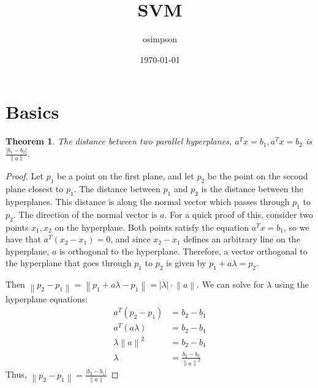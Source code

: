 \documentclass[12pt]{article}
\title{SVM}
\author{osimpson}
\date{\today}
\newtheorem{theorem}{Theorem}
\newcommand{\norm}[1]{\left\lVert#1\right\rVert}
\begin{document}
\maketitle

\section{Basics}

\begin{theorem}
    The distance between two parallel hyperplanes, $a^Tx=b_1, a^Tx=b_2$ is 
    $\frac{|b_1-b_2|}{\norm{a}}$.
\end{theorem}

\begin{proof}
    Let $p_1$ be a point on the first plane, and let $p_2$ be the point on the
    second plane closest to $p_1$.  The distance between $p_1$ and $p_2$ is the
    distance between the hyperplanes.  This distance is along the normal vector
    which passes through $p_1$ to $p_2$.  The direction of the normal vector is
    $a$.  For a quick proof of this, consider two points $x_1, x_2$ on the 
    hyperplane.  Both points satisfy the equation $a^Tx=b_1$, so we have that 
    $a^T(x_2-x_1)=0$, and since $x_2-x_1$ defines an arbitrary line on the
    hyperplane, $a$ is orthogonal to the hyperplane.  Therefore, a vector orthogonal
    to the hyperplane that goes through $p_1$ to $p_2$ is given by $p_1+a\lambda=p_2$.

    Then $\norm{p_2-p_1} = \norm{p_1+a\lambda - p_1} = |\lambda| \cdot \norm{a}$.
    We can solve for $\lambda$ using the hyperplane equations:
    \begin{equation}
        \begin{split}
            a^T(p_2-p_1) &= b_2-b_1 \\
            a^T(a\lambda) &= b_2-b_1 \\
            \lambda\norm{a}^2 &= b_2-b_1 \\
            \lambda &= \frac{b_2 - b_1}{\norm{a}^2}
        \end{split}
    \end{equation}
    Thus, $\norm{p_2 - p_1} = \frac{|b_2-b_1|}{\norm{a}}$

\end{proof}
\end{document}
